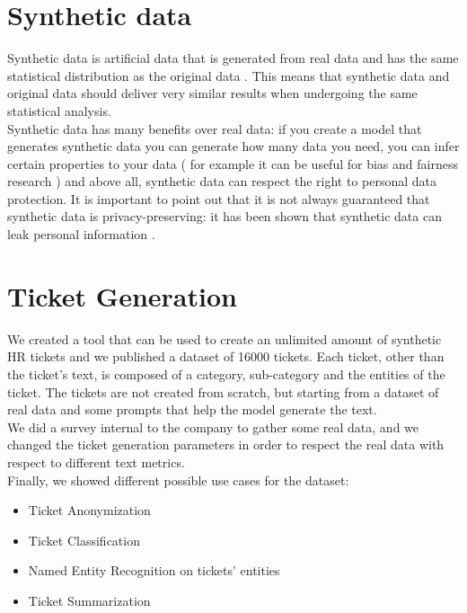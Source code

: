 \section{Synthetic data}
Synthetic data is artificial data that is generated from real data and has the same statistical distribution as the original data . This means that synthetic data and original data should deliver very similar results when undergoing the same statistical analysis. \\
Synthetic data has many benefits over real data: if you create a model that generates synthetic data you can generate how many data you need, you can infer certain properties to your data ( for example it can be useful for bias and fairness research ) and above all, synthetic data can respect the right to personal data protection. It is important to point out that it is not always guaranteed that synthetic data is privacy-preserving: it has been shown that synthetic data can leak personal information \cite{bellovin2019privacy}.\\

\section{Ticket Generation}
We created a tool that can be used to create an unlimited amount of synthetic HR tickets and we published a dataset of 16000 tickets. Each ticket, other than the ticket's text, is composed of a category, sub-category and the entities of the ticket. The tickets are not created from scratch, but starting from a dataset of real data and some prompts that help the model generate the text. \\
We did a survey internal to the company to gather some real data, and we changed the ticket generation parameters in order to respect the real data with respect to different text metrics. \\
Finally, we showed different possible use cases for the dataset:
\begin{itemize}
    \item Ticket Anonymization
    \item Ticket Classification
    \item Named Entity Recognition on tickets' entities
    \item Ticket Summarization
\end{itemize}